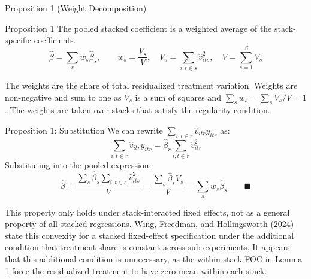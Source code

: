 \documentclass[11pt]{beamer}
\begin{document}
\begin{frame}{Proposition 1 (Weight Decomposition)}
    \begin{block}{Proposition 1}
        The pooled stacked coefficient is a weighted average of the
        stack-specific coefficients.
        \[
            \hat{\beta} = \sum_s w_s \hat{\beta}_s,
            \qquad
            w_s = \frac{V_s}{V},
            \quad
            V_s = \sum_{i,t \in s} \hat{v}_{its}^2,
            \quad
            V = \sum_{s=1}^{S} V_s
        \]
    \end{block}

    The weights are the share of total residualized treatment variation. Weights
    are non-negative and sum to one as $V_s$ is a sum of squares and
    $\sum_s w_s = \sum_s V_s / V = 1$. The weights are taken over stacks that
    satisfy the regularity condition.
\end{frame}

\begin{frame}{Proposition 1: Substitution}
    We can rewrite $\sum_{i,t \in r} \hat{v}_{itr} y_{itr}$ as:
    \[
        \sum_{i,t \in r} \hat{v}_{itr} y_{itr}
        = \hat{\beta}_r \sum_{i,t \in r} \hat{v}_{itr}^2
    \]
    Substituting into the pooled expression:
    \[
        \hat{\beta}
        = \frac{\sum_s \hat{\beta}_s \sum_{i,t \in s} \hat{v}_{its}^2}{V}
        = \frac{\sum_s \hat{\beta}_s V_s}{V}
        = \sum_s w_s \hat{\beta}_s
        \qquad \blacksquare
    \]

    \vspace{5mm}

    \footnotesize
    This property only holds under stack-interacted fixed effects, not as a
    general property of all stacked regressions. Wing, Freedman, and
    Hollingsworth (2024) state this convexity for a stacked fixed-effect
    specification under the additional condition that treatment share is constant
    across sub-experiments. It appears that this additional condition is
    unnecessary, as the within-stack FOC in Lemma 1 force the residualized
    treatment to have zero mean within each stack.

    \vfill
    \hfill\hyperlink{stacked_est}{}
    \hyperlink{appendix}{}
\end{frame}
\end{document}
